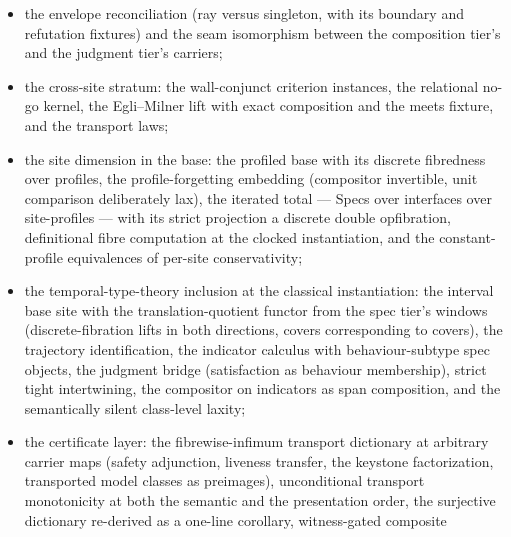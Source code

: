 \begin{itemize}
  with cover-preservation in the site-category vocabulary; the
  state presheaf with its separation and non-separation witnesses,
  the record shadow into probability rows with its strict credal
  band, and the unique-density-state representation theorem; Cauchy
  determinacy at both grades from complete initial data plus a
  reversible mechanism, its reversibility and exhaustiveness
  witnesses, and the frozen-shadow tie; the order-superposition
  probes (no records on a coherently switched index; pointer
  orthogonality classicalizes it); and the assembled locally
  covariant kinematic fragment with its two-qubit inhabitant;
\item the envelope reconciliation (ray versus singleton, with its
  boundary and refutation fixtures) and the seam isomorphism
  between the composition tier's and the judgment tier's carriers;
\item the cross-site stratum: the wall-conjunct criterion
  instances, the relational no-go kernel, the Egli--Milner lift
  with exact composition and the meets fixture, and the transport
  laws;
\item the site dimension in the base: the profiled base with its
  discrete fibredness over profiles, the profile-forgetting
  embedding (compositor invertible, unit comparison deliberately
  lax), the iterated total --- Specs over interfaces over
  site-profiles --- with its strict projection a discrete double
  opfibration, definitional fibre computation at the clocked
  instantiation, and the constant-profile equivalences of per-site
  conservativity;
\item the temporal-type-theory inclusion at the classical
  instantiation: the interval base site with the
  translation-quotient functor from the spec tier's windows
  (discrete-fibration lifts in both directions, covers
  corresponding to covers), the trajectory identification, the
  indicator calculus with behaviour-subtype spec objects, the
  judgment bridge (satisfaction as behaviour membership), strict
  tight intertwining, the compositor on indicators as span
  composition, and the semantically silent class-level laxity;
\item the certificate layer: the fibrewise-infimum transport
  dictionary at arbitrary carrier maps (safety adjunction, liveness
  transfer, the keystone factorization, transported model classes
  as preimages), unconditional transport monotonicity at both the
  semantic and the presentation order, the surjective dictionary
  re-derived as a one-line corollary, witness-gated composite

\end{itemize}
